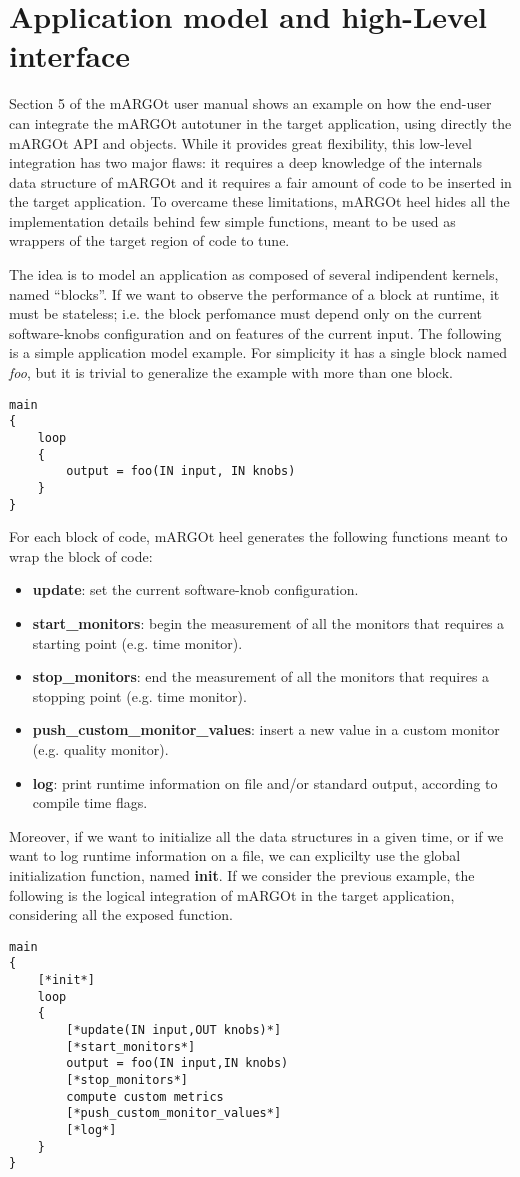 \section{Application model and high-Level interface}

Section 5 of the mARGOt user manual shows an example on how the end-user can integrate the mARGOt autotuner in the target application, using directly the mARGOt API and objects.
While it provides great flexibility, this low-level integration has two major flaws: it requires a deep knowledge of the internals data structure of mARGOt and it requires a fair amount of code to be inserted in the target application.
To overcame these limitations, mARGOt heel hides all the implementation details behind few simple functions, meant to be used as wrappers of the target region of code to tune.

The idea is to model an application as composed of several indipendent kernels, named ``blocks''.
If we want to observe the performance of a block at runtime, it must be stateless; i.e. the block perfomance must depend only on the current software-knobs configuration and on features of the current input.
The following is a simple application model example.
For simplicity it has a single block named \textit{foo}, but it is trivial to generalize the example with more than one block.
\begin{lstlisting}
main
{
	loop
	{
		output = foo(IN input, IN knobs)
	}
}
\end{lstlisting}

For each block of code, mARGOt heel generates the following functions meant to wrap the block of code:
\begin{itemize}
	\item \textbf{update}: set the current software-knob configuration.
	\item \textbf{start\_monitors}: begin the measurement of all the monitors that requires a starting point (e.g. time monitor).
	\item \textbf{stop\_monitors}: end the measurement of all the monitors that requires a stopping point (e.g. time monitor).
	\item \textbf{push\_custom\_monitor\_values}: insert a new value in a custom monitor (e.g. quality monitor).
	\item \textbf{log}: print runtime information on file and/or standard output, according to compile time flags.
\end{itemize}
Moreover, if we want to initialize all the data structures in a given time, or if we want to log runtime information on a file, we can explicilty use the global initialization function, named \textbf{init}.
If we consider the previous example, the following is the logical integration of mARGOt in the target application, considering all the exposed function.
\begin{lstlisting}
main
{
	[*init*]
	loop
	{
		[*update(IN input,OUT knobs)*]
		[*start_monitors*]
		output = foo(IN input,IN knobs)
		[*stop_monitors*]
		compute custom metrics
		[*push_custom_monitor_values*]
		[*log*]
	}
}
\end{lstlisting}

